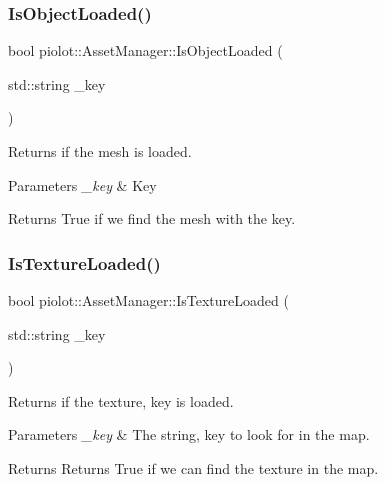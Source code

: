 \subsubsection{\texorpdfstring{Is\+Object\+Loaded()}{IsObjectLoaded()}}
{\footnotesize\ttfamily bool piolot\+::\+Asset\+Manager\+::\+Is\+Object\+Loaded (\begin{DoxyParamCaption}\item[{std\+::string}]{\+\_\+key }\end{DoxyParamCaption})\hspace{0.3cm}{\ttfamily [inline]}}



Returns if the mesh is loaded. 


\begin{DoxyParams}{Parameters}
{\em \+\_\+key} & Key \\
\hline
\end{DoxyParams}
\begin{DoxyReturn}{Returns}
True if we find the mesh with the key. 
\end{DoxyReturn}
\mbox{\label{classpiolot_1_1_asset_manager_acc9c8e5aff5c4b93faa151e0efb012f3}} 
\subsubsection{\texorpdfstring{Is\+Texture\+Loaded()}{IsTextureLoaded()}}
{\footnotesize\ttfamily bool piolot\+::\+Asset\+Manager\+::\+Is\+Texture\+Loaded (\begin{DoxyParamCaption}\item[{std\+::string}]{\+\_\+key }\end{DoxyParamCaption})\hspace{0.3cm}{\ttfamily [inline]}}



Returns if the texture, key is loaded. 


\begin{DoxyParams}{Parameters}
{\em \+\_\+key} & The string, key to look for in the map. \\
\hline
\end{DoxyParams}
\begin{DoxyReturn}{Returns}
Returns True if we can find the texture in the map. 
\end{DoxyReturn}
\mbox{\label{classpiolot_1_1_asset_manager_ac56fdedc1bf3b98909856099811fa62f}} 
